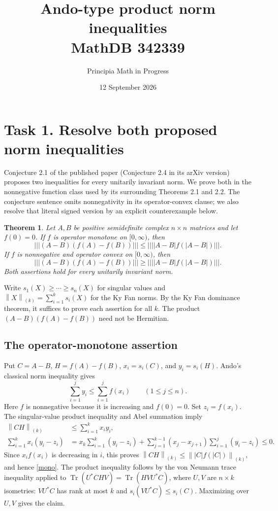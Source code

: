 \documentclass[11pt]{article}
\title{Ando-type product norm inequalities\\MathDB 342339}
\author{Principia Math in Progress}
\date{12 September 2026}
\newtheorem{theorem}{Theorem}
\newcommand{\Tr}{\operatorname{Tr}}
\newcommand{\nn}[1]{\left\lVert#1\right\rVert}
\newcommand{\uin}[1]{\left|\!\left|\!\left|#1\right|\!\right|\!\right|}
\begin{document}
\maketitle

\section*{Task 1. Resolve both proposed norm inequalities}
Conjecture 2.1 of the published paper \cite{DHLV} (Conjecture 2.4 in
its arXiv version) proposes two inequalities for every unitarily
invariant norm. We prove both in the nonnegative function class used
by its surrounding Theorems 2.1 and 2.2. The conjecture sentence omits
nonnegativity in its operator-convex clause; we also resolve that
literal signed version by an explicit counterexample below.

\begin{theorem}\label{main}
Let $A,B$ be positive semidefinite complex $n\times n$ matrices and
let $f(0)=0$.
If $f$ is operator monotone on $[0,\infty)$, then
\begin{equation}\label{mono}
 \uin{(A-B)(f(A)-f(B))}\leq\uin{|A-B|f(|A-B|)}.
\end{equation}
If $f$ is nonnegative and operator convex on $[0,\infty)$, then
\begin{equation}\label{convex}
 \uin{(A-B)(f(A)-f(B))}\geq\uin{|A-B|f(|A-B|)}.
\end{equation}
Both assertions hold for every unitarily invariant norm.
\end{theorem}

Write $s_1(X)\geq\cdots\geq s_n(X)$ for singular values and
$\nn{X}_{(k)}=\sum_{i=1}^k s_i(X)$ for the Ky Fan norms. By the
Ky Fan dominance theorem, it suffices to prove each assertion for
all $k$. The product $ (A-B)(f(A)-f(B))$ need not be Hermitian.

\subsection*{The operator-monotone assertion}
Put $C=A-B$, $H=f(A)-f(B)$, $x_i=s_i(C)$, and $y_i=s_i(H)$.
Ando's classical norm inequality \cite{Ando} gives
\[
 \sum_{i=1}^j y_i\leq\sum_{i=1}^j f(x_i)\qquad(1\leq j\leq n).
\]
Here $f$ is nonnegative because it is increasing and $f(0)=0$.
Set $z_i=f(x_i)$. The singular-value product inequality and Abel
summation imply
\begin{align*}
 \nn{CH}_{(k)}&\leq\sum_{i=1}^k x_i y_i,\\
 \sum_{i=1}^k x_i(y_i-z_i)
 &=x_k\sum_{i=1}^k(y_i-z_i)
   +\sum_{j=1}^{k-1}(x_j-x_{j+1})\sum_{i=1}^j(y_i-z_i)\leq0.
\end{align*}
Since $x_i f(x_i)$ is decreasing in $i$, this proves
$\nn{CH}_{(k)}\leq\nn{|C|f(|C|)}_{(k)}$, and hence \eqref{mono}.
The product inequality follows by the von Neumann trace inequality
applied to
$\Tr(U^*CHV)=\Tr(HVU^*C)$, where $U,V$ are $n\times k$
isometries: $VU^*C$ has rank at most $k$ and
$s_i(VU^*C)\leq s_i(C)$. Maximizing over $U,V$ gives the claim.
\end{document}
